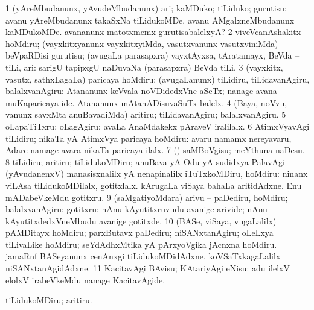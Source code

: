 \gl{\sakirx}
\bmng
\bnum
\num{1} (yAreMbudanunx, yAvudeMbudanunx) ari; kaMDuko; tiLiduko; gurutisu:  avanu yAreMbudanunx takaSxNa tiLidukoMDe.  avanu AMgalxneMbudanunx kaMDukoMDe.  avananunx matotxmemx gurutisabalelxyA? 
\num{2} viveVcanAshakitx hoMdiru; (vayxkitxyanunx vayxkitxyiMda, vasutxvanunx vasutxviniMda) beVpaRDisi gurutisu; (avugaLa parasapxra) vayxtAyxsa, tAratamayx, BeVda -- tiLi, ari:  sarigU tapipxgU naDuvaNa (parasapxra) BeVda tiLi. 
\num{3} (vayxkitx, vasutx, sathxLagaLa) paricaya hoMdiru; (avugaLanunx) tiLidiru, tiLidavanAgiru, balalxvanAgiru:  Atananunx keVvala noVDidedxVne aSeTx; nanage avana muKaparicaya ide.  Atananunx mAtanADisuvaSuTx balelx. 
\num{4} (Baya, noVvu, \mo vanunx savxMta anuBavadiMda) aritiru; tiLidavanAgiru; balalxvanAgiru. 
\num{5} oLapaTiTxru; oLagAgiru;  avaLa AnaMdakekx pAraveV iralilalx. 
\num{6} AtimxVyavAgi tiLidiru; nikaTa yA AtimxVya paricaya hoMdiru:  avaru namamx nereyavaru, Adare namage avara nikaTa paricaya ilalx. 
\num{7} (\pArxparx) saMBoVgisu; meYthuna naDesu. 
\num{8} tiLidiru; aritiru; tiLidukoMDiru; anuBava yA Odu yA sudidxya PalavAgi (yAvudanenxV) manasisxnalilx yA nenapinalilx iTuTxkoMDiru, hoMdiru:  ninanx viLAsa tiLidukoMDilalx, gotitxlalx.  kArugaLa viSaya bahaLa aritidAdxne.  Enu mADabeVkeMdu gotitxru. 
\num{9} (saMgatiyoMdara) arivu -- paDediru, hoMdiru; balalxvanAgiru; gotitxru:  nAnu kAyutitxruvudu avanige arivide; nAnu kAyutitxdedxVneMbudu avanige gotitxde. 
\num{10} (BASe, viSaya, \mo vugaLalilx) pAMDitayx hoMdiru; parxButavx paDediru; niSANxtanAgiru; oLeLxya tiLivaLike hoMdiru; seYdAdhxMtika yA pArxyoVgika jAcnxna hoMdiru.  jamaRnf BASeyanunx cenAnxgi tiLidukoMDidAdxne.  koVSaTxkagaLalilx niSANxtanAgidAdxne. 
\num{11} KacitavAgi BAvisu; KAtariyAgi eNisu:  adu ilelxV elolxV irabeVkeMdu nanage KacitavAgide. 
\enum
\emng

\noindent
\gl{\akirx}
\bmng
tiLidukoMDiru; aritiru. 
\emng

